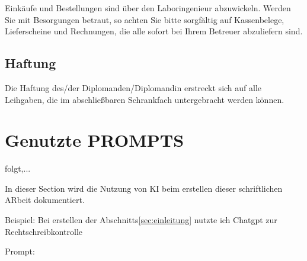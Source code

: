 Einkäufe und Bestellungen sind über den Laboringenieur abzuwickeln. Werden Sie mit Besorgungen betraut, so achten Sie bitte sorgfältig auf Kassenbelege, Lieferscheine und Rechnungen, die alle sofort bei Ihrem Betreuer abzuliefern sind. 

\subsection{Haftung}
Die Haftung des/der Diplomanden/Diplomandin erstreckt sich auf alle Leihgaben, die im abschließbaren Schrankfach untergebracht werden können. 





\section{Genutzte PROMPTS}


folgt,...


In dieser Section wird die Nutzung von KI beim erstellen dieser schriftlichen ARbeit dokumentiert.

Beispiel: Bei erstellen der Abschnitts\ref{sec:einleitung} nutzte ich Chatgpt zur Rechtschreibkontrolle

Prompt: 